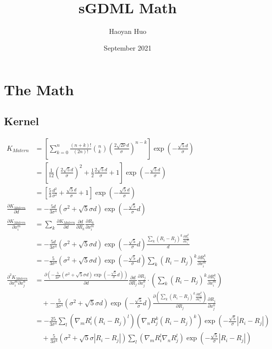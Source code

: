 \documentclass{article}
\title{sGDML Math}
\author{Haoyan Huo}
\date{September 2021}
\begin{document}
\maketitle

\section{The Math}

\subsection{Kernel}

\begin{align*}
    K_{Matern} &= \left[\sum_{k=0}^n \frac{(n+k)!}{(2n)!} \binom{n}{k} \left(\frac{2\sqrt{2\nu }d}{\sigma}\right)^{n-k}\right] \exp\left(-\frac{\sqrt{5}d}{\sigma}\right)\\
    &= \left[\frac{1}{12} \left(\frac{2\sqrt{5}d}{\sigma}\right)^2 + \frac{1}{2} \frac{2\sqrt{5}d}{\sigma} + 1\right]\exp\left(-\frac{\sqrt{5}d}{\sigma}\right)\\
    &= \left[\frac{5}{3} \frac{d^2}{\sigma^2} + \frac{\sqrt{5}d}{\sigma} + 1\right]\exp\left(-\frac{\sqrt{5}d}{\sigma}\right)\\
    \frac{\partial K_{Matern}}{\partial d} &= -\frac{5d}{3\sigma^4} (\sigma^2 + \sqrt{5}\sigma d)\exp\left(-\frac{\sqrt{5}}{\sigma} d\right)\\
    \frac{\partial K_{Matern}}{\partial x_i^m} &= \sum_k \frac{\partial K_{Matern}}{\partial d}\frac{\partial d}{\partial R_k}\frac{\partial R_k}{\partial x_i^m}\\
    &= -\frac{5d}{3\sigma^4} (\sigma^2 + \sqrt{5}\sigma d)\exp\left(-\frac{\sqrt{5}}{\sigma} d\right) \frac{\sum_k (R_i-R_j)^k\frac{\partial R_i^k}{\partial x_i^m}}{d} \\
    &= -\frac{5}{3\sigma^4} (\sigma^2 + \sqrt{5}\sigma d)\exp\left(-\frac{\sqrt{5}}{\sigma} d\right) \sum_k (R_i-R_j)^k\frac{\partial R_i^k}{\partial x_i^m}\\
    \frac{\partial ^2 K_{Matern}}{\partial x_i^m \partial x_j^n} &= \frac{\partial \left(-\frac{5}{3\sigma^4} (\sigma^2 + \sqrt{5}\sigma d)\exp\left(-\frac{\sqrt{5}}{\sigma} d\right)\right)}{\partial d}\frac{\partial d}{\partial R_j}\frac{\partial R_j}{\partial x_j^n}\cdot \left(\sum_k (R_i-R_j)^k\frac{\partial R_i^k}{\partial x_i^m}\right) \\
    &\quad + -\frac{5}{3\sigma^4} (\sigma^2 + \sqrt{5}\sigma d)\exp\left(-\frac{\sqrt{5}}{\sigma} d\right) \frac{\partial\left(\sum_k (R_i-R_j)^k\frac{\partial R_i^k}{\partial x_i^m}\right)}{\partial R_j}\frac{\partial R_j}{\partial x_j^n}\\
    &=- \frac{25}{3\sigma^4} \sum_l \left(\nabla_m R_i^l (R_i-R_j)^l\right)\left(\nabla_n R_j^k (R_i-R_j)^k\right) \exp\left(-\frac{\sqrt{5}}{\sigma} |R_i-R_j|\right) \\
    & \quad + \frac{5}{3\sigma^4} (\sigma^2 + \sqrt{5}\sigma |R_i - R_j|) \sum_l \left(\nabla_m R_i^l \nabla_n R_j^l\right) \exp\left(-\frac{\sqrt{5}}{\sigma} |R_i-R_j|\right)
\end{align*}
\end{document}
